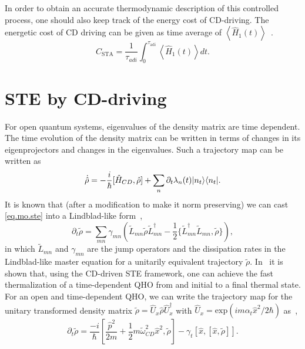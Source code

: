 \documentclass[aps,pra,twocolumn,showpacs,showkeys,groupedaddress,nobalancelastpage,nofootinbib,floatfix,superscriptaddress,longbibliography]{revtex4-2}
\begin{document}
In order to obtain an accurate thermodynamic description of this controlled process, one should also keep track of the energy cost of CD-driving. The energetic cost of CD driving can be given as time average of $\left\langle \hat{H}_1(t) \right\rangle$~\cite{PhysRevE.98.032121}.
\begin{equation}\label{sta.cost}
C_{\text{STA}} = \frac{1}{\tau_{adi}}\int_{0}^{\tau_{\text{adi}}} \left\langle \hat{H}_1(t) \right\rangle dt.
\end{equation}

\section{STE by CD-driving}
\label{sec:stt}
For open quantum systems, eigenvalues of the density matrix are time dependent. The time evolution of the density matrix can be written in terms of changes in its eigenprojectors and changes in the eigenvalues. Such a trajectory map can be written as
\begin{equation}\label{eq.mo.ste}
   \dot{\hat{\rho}} = -\frac{i}{\hbar}[\hat{H}_{CD},\hat{\rho}] + \sum_{n}\partial_t \lambda_n(t)|n_t\rangle\langle n_t|.
\end{equation}
It is known that (after a modification to make it norm preserving) we can cast \cref{eq.mo.ste} into a Lindblad-like form~\cite{Alipour2020shortcutsto},
\begin{equation}\label{lind.like.ste}
   \partial_t \tilde{\rho} = \sum_{mn}\gamma_{mn}(\tilde{L}_{mn} \tilde{\rho} \tilde{L}_{mn}^{\dagger} - \frac{1}{2}\{\tilde{L}_{mn}^{\dagger} \tilde{L}_{mn}, \tilde{\rho}\}),
\end{equation}
in which $\tilde{L}_{mn}$ and $\gamma_{mn}$ are the jump operators and the dissipation rates in the Lindblad-like master equation for a
unitarily equivalent trajectory $\tilde{\rho}$. In~\cite{Alipour2020shortcutsto} it is shown that, using the CD-driven STE framework, one can achieve the fast thermalization of a time-dependent QHO from and initial to a final thermal state. For an open and time-dependent QHO, we can write the trajectory map for the unitary transformed density matrix $\tilde{\rho}=\hat{U}_x \hat{\rho} \hat{U}_x^{\dagger}$ with $\hat{U}_x = \text{exp}(im\alpha_t \hat{x}^2/2\hbar)$ as~\cite{Alipour2020shortcutsto},
\begin{equation}\label{qho.ste.master}
\partial_t \tilde{\rho} = \frac{-i}{\hbar} \left[\frac{\hat{p}^2}{2m} + \frac{1}{2} m\tilde{\omega}_{CD}^2 \hat{x}^2,  \tilde{\rho}\right] - \gamma_t \left[\hat{x}, \left[\hat{x}, \tilde{\rho}\right]\right].
\end{equation}
\end{document}
